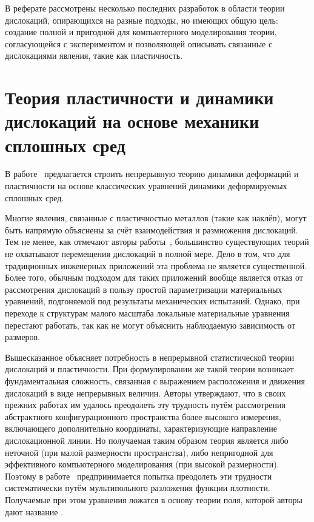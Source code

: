 \documentclass[a4paper, 14pt, titlepage]{extarticle}
\begin{document}
  В реферате рассмотрены несколько последних разработок в области теории дислокаций,
  опирающихся на разные подходы, но имеющих общую цель: создание полной и пригодной для
  компьютерного моделирования теории, согласующейся с экспериментом и позволяющей описывать
  связанные с дислокациями явления, такие как пластичность.

  \section{Теория пластичности и динамики дислокаций на основе механики сплошных сред}

  В работе~\cite{hochrainer-cdd} предлагается строить непрерывную теорию динамики деформаций и
  пластичности на основе классических уравнений динамики деформируемых сплошных сред.

  Многие явления, связанные с пластичностью металлов (такие как наклёп), могут быть напрямую
  объяснены за счёт взаимодействия и размножения дислокаций. Тем не менее, как отмечают авторы
  работы~\cite{hochrainer-cdd}, большинство существующих теорий не охватывают перемещения дислокаций в полной мере.
  Дело в том, что для традиционных инженерных приложений эта проблема не является существенной.
  Более того, обычным подходом для таких приложений вообще является отказ от рассмотрения дислокаций
  в пользу простой параметризации материальных уравнений, подгоняемой под результаты механических
  испытаний. Однако, при переходе к структурам малого масштаба локальные материальные уравнения
  перестают работать, так как не могут объяснить наблюдаемую зависимость от размеров.

  Вышесказанное объясняет потребность в непрерывной статистической теории дислокаций и пластичности. При
  формулировании же такой теории возникает фундаментальная сложность, связанная с выражением
  расположения и движения дислокаций в виде непрерывных величин. Авторы утверждают, что в своих
  прежних работах им удалось преодолеть эту трудность путём рассмотрения абстрактного
  конфигурационного пространства более высокого измерения, включающего дополнительно координаты,
  характеризующие направление дислокационной линии. Но получаемая таким образом теория является либо
  неточной (при малой размерности пространства), либо непригодной для эффективного компьютерного
  моделирования (при высокой размерности). Поэтому в работе~\cite{hochrainer-cdd} предпринимается попытка
  преодолеть эти трудности систематически путём мультипольного разложения функции плотности.
  Получаемые при этом уравнения ложатся в основу теории поля, которой авторы дают название
  .
\end{document}
